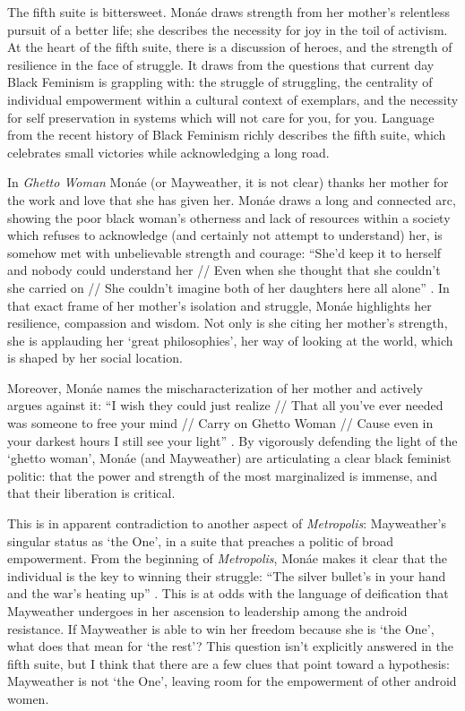 \documentclass[a4paper, 11pt]{article} %
\begin{document}
The fifth suite is bittersweet.
Mon\'ae draws strength from her mother's relentless pursuit of a better life; she describes the necessity for joy in the toil of activism.
At the heart of the fifth suite, there is a discussion of heroes, and the strength of resilience in the face of struggle.
It draws from the questions that current day Black Feminism is grappling with: the struggle of struggling, the centrality of individual empowerment within a cultural context of exemplars, and the necessity for self preservation in systems which will not care for you, for you.
Language from the recent history of Black Feminism richly describes the fifth suite, which celebrates small victories while acknowledging a long road.

In \emph{Ghetto Woman} Mon\'ae (or Mayweather, it is not clear) thanks her mother for the work and love that she has given her.
Mon\'ae draws a long and connected arc, showing the poor black woman's otherness and lack of resources within a society which refuses to acknowledge (and certainly not attempt to understand) her, is somehow met with unbelievable strength and courage:
``She'd keep it to herself and nobody could understand her // Even when she thought that she couldn't she carried on // She couldn't imagine both of her daughters here all alone'' \cite{ghettowoman}.
In that exact frame of her mother's isolation and struggle, Mon\'ae highlights her resilience, compassion and wisdom.
Not only is she citing her mother's strength, she is applauding her `great philosophies', her way of looking at the world, which is shaped by her social location.

Moreover, Mon\'ae names the mischaracterization of her mother and actively argues against it:
``I wish they could just realize // That all you've ever needed was someone to free your mind // Carry on Ghetto Woman // Cause even in your darkest hours I still see your light'' \cite{ghettowoman}.
By vigorously defending the light of the `ghetto woman', Mon\'ae (and Mayweather) are articulating a clear black feminist politic: that the power and strength of the most marginalized is immense, and that their liberation is critical. 

This is in apparent contradiction to another aspect of \emph{Metropolis}: Mayweather's singular status as `the One', in a suite that preaches a politic of broad empowerment.
From the beginning of \emph{Metropolis}, Mon\'ae makes it clear that the individual is the key to winning their struggle:
``The silver bullet's in your hand and the war's heating up'' \cite{manymoons}.
This is at odds with the language of deification that Mayweather undergoes in her ascension to leadership among the android resistance.
 If Mayweather is able to win her freedom because she is `the One', what does that mean for `the rest'?
This question isn't explicitly answered in the fifth suite, but I think that there are a few clues that point toward a hypothesis: Mayweather is not `the One', leaving room for the empowerment of other android women.
\end{document}
